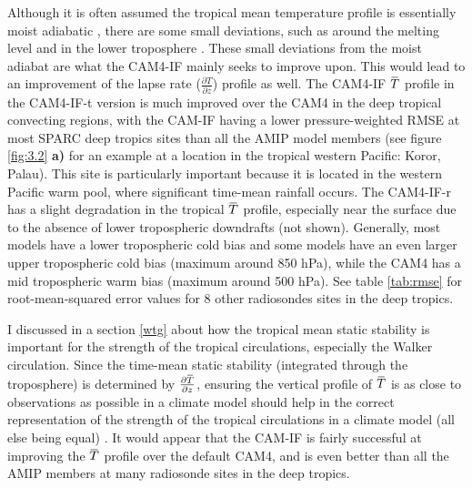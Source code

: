 \documentclass[letterpaper,12pt,titlepage,oneside,final]{book}
\newcommand{\overbar}[1]{\mkern 1.5mu\overline{\mkern-1.5mu#1\mkern-1.5mu}\mkern 1.5mu}
\begin{document}
Although it is often assumed the tropical mean temperature profile is essentially moist adiabatic \citep{emanuel_quasi-equilibrium_2007}, there are some small deviations, such as around the melting level and in the lower troposphere \citep{folkins_melting_2013}. These small deviations from the moist adiabat are what the CAM4-IF mainly seeks to improve upon. This would lead to an improvement of the lapse rate ($\frac{\partial{T}}{\partial{z}}$) profile as well. 
The CAM4-IF $\overbar{T}$ profile in the CAM4-IF-t version is much improved over the CAM4 in the deep tropical convecting regions, with the CAM-IF having a lower pressure-weighted RMSE at most SPARC deep tropics sites than all the AMIP model members (see figure \ref{fig:3.2} \textbf{a)} for an example at a location in the tropical western Pacific: Koror, Palau). This site is particularly important because it is located in the western Pacific warm pool, where significant time-mean rainfall occurs. The CAM4-IF-r has a slight degradation in the tropical $\overbar{T}$ profile, especially near the surface due to the absence of lower tropospheric downdrafts (not shown). Generally, most models have a lower tropospheric cold bias and some models have an even larger upper tropospheric cold bias (maximum around 850 hPa), while the CAM4 has a mid tropospheric warm bias (maximum around 500 hPa). See table \ref{tab:rmse} for root-mean-squared error values for 8 other radiosondes sites in the deep tropics.

I discussed in a section \ref{wtg} about how the tropical mean static stability is important for the strength of the tropical circulations, especially the Walker circulation. Since the time-mean static stability (integrated through the troposphere) is determined by $\frac{\partial{\overbar{T}}}{\partial{z}}$, ensuring the vertical profile of $\overbar{T}$ is as close to observations as possible in a climate model should help in the correct representation of the strength of the tropical circulations in a climate model (all else being equal) \citep{sohn_role_2016,mitas_recent_2006}. It would appear that the CAM-IF is fairly successful at improving the $\overbar{T}$ profile over the default CAM4, and is even better than all the AMIP members at many radiosonde sites in the deep tropics. 
\end{document}
